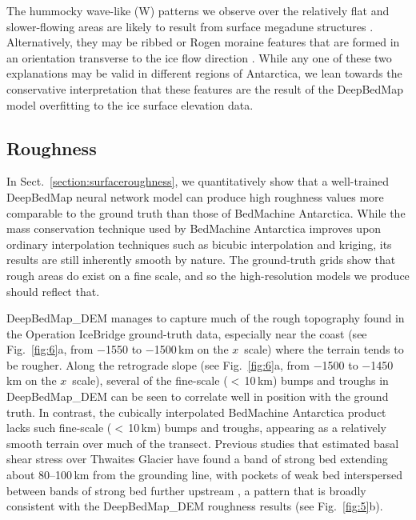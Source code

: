 \documentclass[tc, noline]{copernicus}
\begin{document}
\hack{\newpage}

The hummocky wave-like (W) patterns we observe over the relatively flat and slower-flowing areas are likely to result from surface megadune
structures \citep{ScambosSnowMegadune2014}. Alternatively, they may be ribbed or Rogen moraine features that are formed in an orientation transverse
to the ice flow direction \citep{HattestrandRibbedmorainesSweden1997,HattestrandRibbedmoraineformation1999}. While any one of these two explanations
may be valid in different regions of Antarctica, we lean towards the conservative interpretation that these features are the result of the DeepBedMap
model overfitting to the ice surface elevation data.

\subsection{Roughness}

In Sect.~\ref{section:surfaceroughness}, we quantitatively show that a well-trained DeepBedMap neural network model can produce high roughness values more
comparable to the ground truth than those of BedMachine Antarctica. While the mass conservation technique used by BedMachine Antarctica
\citep{MorlighemDeepglacialtroughs2019} improves upon ordinary interpolation techniques such as bicubic interpolation and kriging, its results are
still inherently smooth by nature. The ground-truth grids show that rough areas do exist on a fine scale, and so the high-resolution models we produce
should reflect that.

DeepBedMap\_DEM manages to capture much of the rough topography found in the Operation IceBridge ground-truth data, especially near the coast (see
Fig.~\ref{fig:6}a, from $-$1550 to $-$1500\,\unit{km} on the $x$~scale) where the terrain tends to be rougher. Along the retrograde slope (see
Fig.~\ref{fig:6}a, from $-$1500 to $-$1450\,\unit{km} on the $x$~scale), several of the fine-scale ($<$\,10\,\unit{km}) bumps and troughs in
DeepBedMap\_DEM can be seen to correlate well in position with the ground truth. In contrast, the cubically interpolated BedMachine Antarctica product
lacks such fine-scale ($<$\,10\,\unit{km}) bumps and troughs, appearing as a relatively smooth terrain over much of the transect. Previous studies
that estimated basal shear stress over Thwaites Glacier have found a band of strong bed extending about 80--100\,\unit{km} from the grounding line,
with pockets of weak bed interspersed between bands of strong bed further upstream
\citep{JoughinBasalconditionsPine2009,SergienkoRegularPatternsFrictional2013}, a pattern that is broadly consistent with the DeepBedMap\_DEM roughness
results (see Fig.~\ref{fig:5}b).
\end{document}
